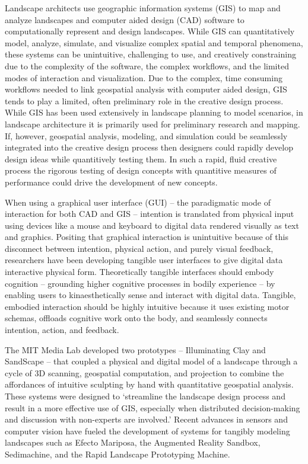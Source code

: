 \documentclass[Afour,sagev,times]{sagej} %
\begin{document}
Landscape architects use 
geographic information systems (GIS) to map and analyze landscapes
and computer aided design (CAD) software
to computationally represent and design landscapes.
While GIS can quantitatively model, analyze, simulate, and visualize 
complex spatial and temporal phenomena,
these systems can be unintuitive, 
challenging to use, and creatively constraining
due to the complexity of the software, 
the complex workflows, 
and the limited modes of interaction and visualization. 
\cite{Ratti2004}
Due to the complex, time consuming workflows 
needed to link geospatial analysis with computer aided design, 
GIS tends to play a limited, 
often preliminary role in the creative design process.
While GIS has been used extensively in landscape planning 
to model scenarios, \cite{Steinitz2004,Baker2004,Steinitz2012}
in landscape architecture
it is primarily used for preliminary research and mapping.
If, however, geospatial analysis, modeling, and simulation
could be seamlessly integrated into the creative design process 
then designers could rapidly develop design ideas
while quantitively testing them. 
In such a rapid, fluid creative process
the rigorous testing of design concepts 
with quantitive measures of performance 
could drive the development of new concepts.

When using a graphical user interface (GUI) 
-- the paradigmatic mode of interaction for both CAD and GIS --  
intention is translated from physical input 
using devices like a mouse and keyboard 
to digital data rendered visually as text and graphics. 
Positing that graphical interaction is unintuitive
because of this disconnect between 
intention, physical action, and purely visual feedback,
researchers have been developing tangible user interfaces 
to give digital data interactive physical form. 
\cite{Dourish2001,Ishii2008} 
Theoretically tangible interfaces should embody cognition 
-- grounding higher cognitive processes in bodily experience --
by enabling users to kinaesthetically sense and interact with digital data.
\cite{Kirsh2013}
Tangible, embodied interaction should be highly intuitive 
because it uses existing motor schemas,  
offloads cognitive work onto the body,
and seamlessly connects intention, action, and feedback.

The MIT Media Lab developed two prototypes 
-- Illuminating Clay and SandScape -- 
that coupled a physical and digital model of a landscape
through a cycle of 3D scanning, geospatial computation, and projection
to combine the affordances of intuitive sculpting by hand
with quantitative geospatial analysis. \cite{Piper2002a}
These systems were designed to 
`streamline the landscape design process 
and result in a more effective use of GIS, 
especially when distributed decision-making and discussion 
with non-experts are involved.' \cite{Ratti2004}
Recent advances in sensors and computer vision
have fueled the development of 
systems for tangibly modeling landscapes such as 
Efecto Mariposa, \cite{Vivo2011}
the Augmented Reality Sandbox, 
\cite{Kreylos2012,ARsandbox}
Sedimachine, \cite{Cantrell2014} and
the Rapid Landscape Prototyping Machine. \cite{Robinson2014}
\end{document}
